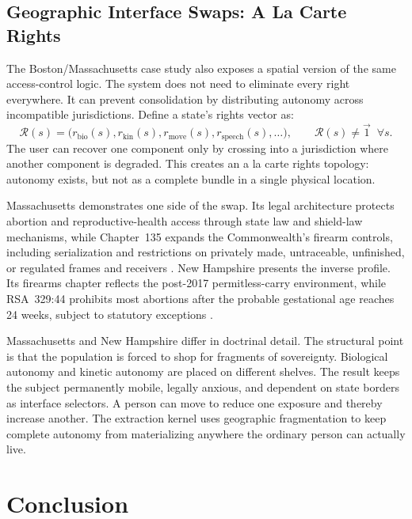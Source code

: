 \section{Geographic Interface Swaps: A La Carte Rights}

The Boston/Massachusetts case study also exposes a spatial version of the same access-control logic. The system does not need to eliminate every right everywhere. It can prevent consolidation by distributing autonomy across incompatible jurisdictions. Define a state's rights vector as:
\begin{equation}\label{eq:15.2-geographic-interface-swap}
\mathcal{R}(s)=
\bigl(r_{\text{bio}}(s), r_{\text{kin}}(s), r_{\text{move}}(s), r_{\text{speech}}(s), \ldots\bigr),
\qquad
\mathcal{R}(s) \neq \vec{1} \;\; \forall s .
\end{equation}
The user can recover one component only by crossing into a jurisdiction where another component is degraded. This creates an a la carte rights topology: autonomy exists, but not as a complete bundle in a single physical location.

Massachusetts demonstrates one side of the swap. Its legal architecture protects abortion and reproductive-health access through state law and shield-law mechanisms, while Chapter~135 expands the Commonwealth's firearm controls, including serialization and restrictions on privately made, untraceable, unfinished, or regulated frames and receivers \cite{mass_abortion_law_2026,mass_chapter_135_2024}. New Hampshire presents the inverse profile. Its firearms chapter reflects the post-2017 permitless-carry environment, while RSA~329:44 prohibits most abortions after the probable gestational age reaches 24 weeks, subject to statutory exceptions \cite{nh_firearms_ch159_2026,nh_abortion_statute_2026}.

Massachusetts and New Hampshire differ in doctrinal detail. The structural point is that the population is forced to shop for fragments of sovereignty. Biological autonomy and kinetic autonomy are placed on different shelves. The result keeps the subject permanently mobile, legally anxious, and dependent on state borders as interface selectors. A person can move to reduce one exposure and thereby increase another. The extraction kernel uses geographic fragmentation to keep complete autonomy from materializing anywhere the ordinary person can actually live.


\chapter{Conclusion}
\label{ch:conclusion}

